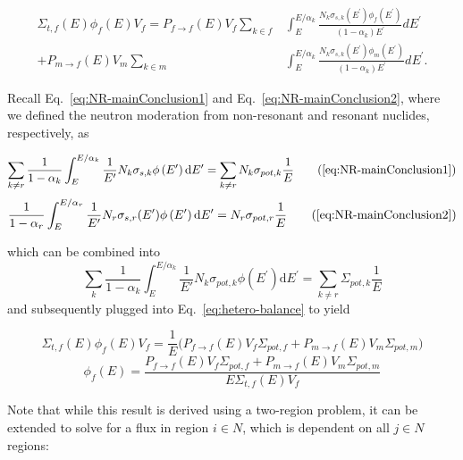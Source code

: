 \documentclass[10pt]{article}
\begin{document}
\begin{align}\Sigma_{t,f}(E)\phi_{f}(E)V_{f} = P_{f\rightarrow f}(E)V_{f}\sum\limits_{k\in f}&\int_{E}^{E/\alpha_{k}}\frac{N_{k}\sigma_{s,k}\left(E^{\prime}\right)\phi_{f}\left(E^{\prime}\right)}{\left(1-\alpha_{k}\right)E^{\prime}}dE^{\prime}  \\
+ P_{m\rightarrow f}(E)V_{m}\sum\limits_{k\in m}&\int_{E}^{E/\alpha_{k}}\frac{N_{k}\sigma_{s,k}\left(E^{\prime}\right)\phi_{m}\left(E^{\prime}\right)}{\left(1-\alpha_{k}\right)E^{\prime}}dE^{\prime}.\label{eq:hetero-balance}\end{align}



 Recall Eq.~\ref{eq:NR-mainConclusion1} and Eq.~\ref{eq:NR-mainConclusion2}, where we defined the neutron moderation from non-resonant and resonant nuclides, respectively, as

\begin{equation*}\sum\limits_{k\neq r}\frac{1}{1-\alpha_{k}}\int_{E}^{E/\alpha_{k}}\frac{1}{E'}N_{k}\sigma_{s,k}\phi\left(E^{\prime}\right)\mathrm{d}E^{\prime}=\sum\limits_{k\neq r}N_{k}\sigma_{pot,k}\frac{1}{E}\tag{\ref{eq:NR-mainConclusion1}}\end{equation*}
\begin{equation*}
  \frac{1}{1-\alpha_r}\int_{E}^{E/\alpha_{r}}\frac{1}{E'}N_{r}\sigma_{s,r}(E')\phi\left(E'\right)\mathrm{d}E^{\prime}=N_{r}\sigma_{pot,r}\frac{1}{E}
  \tag{\ref{eq:NR-mainConclusion2}}
\end{equation*}

which can be combined into
\begin{equation}\sum\limits_{k}\frac{1}{1-\alpha_{k}}\int_{E}^{E/\alpha_{k}}\frac{1}{E'}N_{k}\sigma_{pot,k}\phi\left(E^{\prime}\right)\mathrm{d}E^{\prime}=\sum\limits_{k\neq r}\Sigma_{pot,k}\frac{1}{E}\end{equation}
and subsequently plugged into Eq.~\ref{eq:hetero-balance} to yield


\begin{equation}\Sigma_{t,f}(E)\phi_{f}(E)V_{f}=\frac{1}{E}\Big(P_{f\rightarrow f}(E)V_{f}\Sigma_{pot,f}+P_{m\rightarrow f}(E)V_{m}\Sigma_{pot,m}\Big)\end{equation}
\begin{equation}\phi_{f}(E)=\frac{P_{f\rightarrow f}(E)V_f\Sigma_{pot,f}+P_{m\rightarrow f}(E)V_m\Sigma_{pot,m}}{E\Sigma_{t,f}(E)V_f}\end{equation}

Note that while this result is derived using a two-region problem, it can be extended to solve for a flux in region $i\in N$, which is dependent on all $j\in N$ regions:
\end{document}
